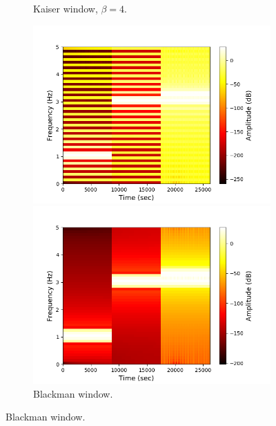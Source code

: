 \begin{figure}[H]
\begin{subfigure}{0.49\textwidth}
\caption{Kaiser window, $\beta=4$.}
\label{fig:stft_kaiser_100_4}
\end{subfigure}
\begin{subfigure}{0.49\textwidth}
\centering
\includegraphics[width=\textwidth]{figures/stft_windows/100/bartlett.png}
\caption{Bartlett window.}
\label{fig:stft_bartlett_100}
\includegraphics[width=\textwidth]{figures/stft_windows/100/blackman.png}
\caption{Blackman window.}
\label{fig:stft_blackman_100}

\end{subfigure}
\end{figure}
